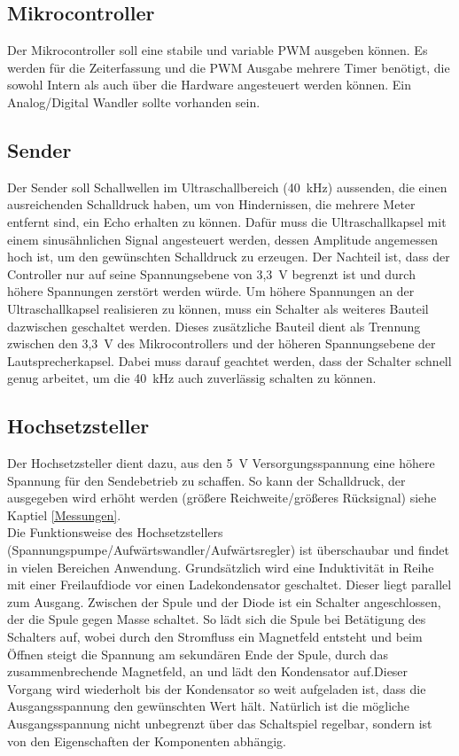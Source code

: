 \subsection{Mikrocontroller}
Der Mikrocontroller soll eine stabile und variable PWM ausgeben können. Es werden für die Zeiterfassung und die PWM Ausgabe mehrere Timer benötigt, die sowohl Intern als auch über die Hardware angesteuert werden können. Ein Analog/Digital Wandler sollte vorhanden sein.

\subsection{Sender}
Der Sender soll Schallwellen im Ultraschallbereich (40~kHz) aussenden, die einen ausreichenden Schalldruck haben, um von Hindernissen, die mehrere Meter entfernt sind, ein Echo erhalten zu können.
Dafür muss die Ultraschallkapsel mit einem sinusähnlichen Signal angesteuert werden, dessen Amplitude angemessen hoch ist, um den gewünschten Schalldruck zu erzeugen. Der Nachteil ist, dass der Controller nur auf seine Spannungsebene von 3,3~V begrenzt ist und durch höhere Spannungen zerstört werden würde.
Um höhere Spannungen an der Ultraschallkapsel realisieren zu können, muss ein Schalter als weiteres Bauteil dazwischen geschaltet werden. Dieses zusätzliche Bauteil dient als Trennung zwischen den 3,3~V des Mikrocontrollers und der höheren Spannungsebene der Lautsprecherkapsel. Dabei muss darauf geachtet werden, dass der Schalter schnell genug arbeitet, um die 40~kHz auch zuverlässig schalten zu können.

\subsection{Hochsetzsteller}
Der Hochsetzsteller dient dazu, aus den 5~V Versorgungsspannung eine höhere Spannung für den Sendebetrieb zu schaffen. So kann der Schalldruck, der ausgegeben wird erhöht werden (größere Reichweite/größeres Rücksignal) siehe Kaptiel \ref{Messungen}.\\
Die Funktionsweise des Hochsetzstellers (Spannungspumpe/Aufwärtswandler/Aufwärtsregler) ist überschaubar und findet in vielen Bereichen Anwendung. Grundsätzlich wird eine Induktivität in Reihe mit einer Freilaufdiode vor einen Ladekondensator geschaltet. Dieser liegt parallel zum Ausgang. Zwischen der Spule und der Diode ist ein Schalter angeschlossen, der die Spule gegen Masse schaltet. So lädt sich die Spule bei Betätigung des Schalters auf, wobei durch den Stromfluss ein Magnetfeld entsteht und beim Öffnen steigt die Spannung am sekundären Ende der Spule, durch das zusammenbrechende Magnetfeld, an und lädt den Kondensator auf.Dieser Vorgang wird wiederholt bis der Kondensator so weit aufgeladen ist, dass die Ausgangsspannung den gewünschten Wert hält. Natürlich ist die mögliche Ausgangsspannung nicht unbegrenzt über das Schaltspiel regelbar, sondern ist von den Eigenschaften der Komponenten abhängig. 

